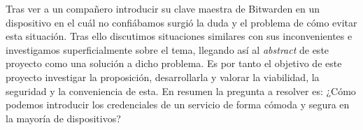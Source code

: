 Tras ver a un compañero introducir su clave maestra de Bitwarden en un dispositivo en el cuál no confiábamos surgió la duda y el problema de cómo evitar esta situación. Tras ello discutimos situaciones similares con sus inconvenientes e investigamos superficialmente sobre el tema, llegando así al \textit{abstract} de este proyecto como una solución a dicho problema. Es por tanto el objetivo de este proyecto investigar la proposición, desarrollarla y valorar la viabilidad, la seguridad y la conveniencia de esta. En resumen la pregunta a resolver es: ¿Cómo podemos introducir los credenciales de un servicio de forma cómoda y segura en la mayoría de dispositivos?